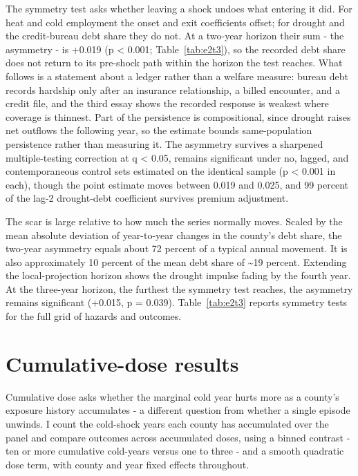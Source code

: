 \documentclass[a4paper,11pt]{report}
\begin{document}
The symmetry test asks whether leaving a shock undoes what entering it did. For heat and cold employment the onset and exit coefficients offset; for drought and the credit-bureau debt share they do not. At a two-year horizon their sum - the asymmetry - is +0.019 (p < 0.001; Table~\ref{tab:e2t3}), so the recorded debt share does not return to its pre-shock path within the horizon the test reaches. What follows is a statement about a ledger rather than a welfare measure: bureau debt records hardship only after an insurance relationship, a billed encounter, and a credit file, and the third essay shows the recorded response is weakest where coverage is thinnest. Part of the persistence is compositional, since drought raises net outflows the following year, so the estimate bounds same-population persistence rather than measuring it. The asymmetry survives a sharpened multiple-testing correction at q < 0.05, remains significant under no, lagged, and contemporaneous control sets estimated on the identical sample (p < 0.001 in each), though the point estimate moves between 0.019 and 0.025, and 99 percent of the lag-2 drought-debt coefficient survives premium adjustment.

The scar is large relative to how much the series normally moves. Scaled by the mean absolute deviation of year-to-year changes in the county's debt share, the two-year asymmetry equals about 72 percent of a typical annual movement. It is also approximately 10 percent of the mean debt share of \textasciitilde{}19 percent. Extending the local-projection horizon shows the drought impulse fading by the fourth year. At the three-year horizon, the furthest the symmetry test reaches, the asymmetry remains significant (+0.015, p = 0.039). Table~\ref{tab:e2t3} reports symmetry tests for the full grid of hazards and outcomes.



\FloatBarrier
\section{Cumulative-dose results}

Cumulative dose asks whether the marginal cold year hurts more as a county's exposure history accumulates - a different question from whether a single episode unwinds. I count the cold-shock years each county has accumulated over the panel and compare outcomes across accumulated doses, using a binned contrast - ten or more cumulative cold-years versus one to three - and a smooth quadratic dose term, with county and year fixed effects throughout.
\end{document}
